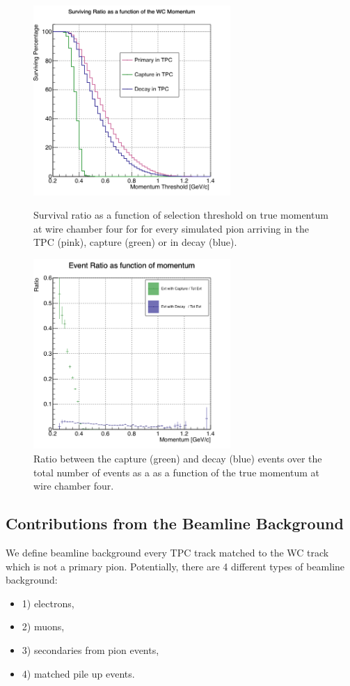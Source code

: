 \begin{figure}[]
\centering
\begin{minipage}[t]{0.45\textwidth}
\centering
\includegraphics[width=7.5cm]{Chapter-7/Images/CDThreshold.png}
\caption{Survival ratio as a function of selection threshold on true momentum at wire chamber four for for every simulated pion arriving in the TPC (pink), capture (green) or in decay (blue).   }
\label{fig:survRatio}
\end{minipage}\hfill
\begin{minipage}[t]{0.45\textwidth}
\centering
\includegraphics[width=7.5cm]{Chapter-7/Images/CDRatio.png}
\caption{Ratio between the capture (green) and decay (blue) events over the total number of events as a as a function of the true momentum at wire chamber four.}
\label{fig:evtRatio}
\end{minipage}
\end{figure}

\clearpage
\subsection{Contributions from the Beamline Background}\label{ch:PionXSBkgSub2}
We define beamline background every TPC track matched to the WC track which is not a primary pion. Potentially, there are 4 different types of beamline background:
\begin{itemize}
\item[]1) electrons,
\item[]2) muons,
\item[]3) secondaries from pion events,
\item[]4) matched pile up events.
\end{itemize}

